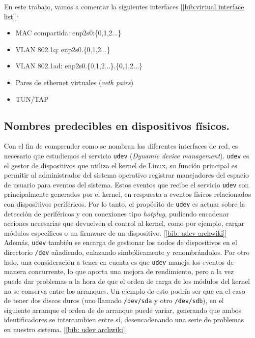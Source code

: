 \documentclass[12pt]{article}
\begin{document}
	\par \noindent En este trabajo, vamos a comentar la siguientes interfaces [\ref{bib:virtual interface list}]:
	\begin{itemize}
		\item MAC compartida: enp2s0:\{0,1,2...\}
		\item VLAN 802.1q: enp2s0.\{0,1,2...\}
		\item VLAN 802.1ad: enp2s0.\{0,1,2...\}.\{0,1,2...\}
		\item Pares de ethernet virtuales (\textit{veth pairs})
		\item TUN/TAP
	\end{itemize}


	\subsection{Nombres predecibles en dispositivos físicos.}
	\noindent Con el fin de comprender como se nombran las diferentes interfaces de red, es necesario que estudiemos el servicio \texttt{udev} (\textit{Dynamic device management}). \texttt{udev} es el gestor de dispositivos que utiliza el kernel de Linux, su función principal es permitir al administrador del sistema operativo registrar manejadores del espacio de usuario para eventos del sistema. Estos eventos que recibe el servicio \texttt{udev} son principalmente generados por el kernel, en respuesta a eventos físicos relacionados con dispositivos periféricos. Por lo tanto, el propósito de \texttt{udev} es actuar sobre la detección de periféricos y con conexiones tipo \textit{hotplug}, pudiendo encadenar acciones necesarias que devuelven el control al kernel, como por ejemplo, cargar módulos específicos o un firmware de un dispositivo. [\ref{bib: udev archwiki}] \\
	
	\noindent Además, \texttt{udev} también se encarga de gestionar los nodos de dispositivos en el directorio \texttt{/dev} añadiendo, enlazando simbólicamente y renombrándolos. Por otro lado, una consideración a tener en cuenta es que \texttt{udev} maneja los eventos de manera concurrente, lo que aporta una mejora de rendimiento, pero a la vez puede dar problemas a la hora de que el orden de carga de los módulos del kernel no se conserva entre los arranques. Un ejemplo de esto podría ser que en el caso de tener dos discos duros (uno llamado \texttt{/dev/sda} y otro \texttt{/dev/sdb}), en el siguiente arranque el orden de de arranque puede variar, generando que ambos identificadores se intercambien entre sí, desencadenando una serie de problemas en nuestro sistema. [\ref{bib: udev archwiki}]\\
	
\end{document}
